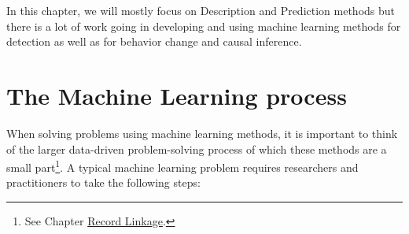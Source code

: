 \documentclass[]{krantz}
\begin{document}
In this chapter, we will mostly focus on Description and Prediction
methods but there is a lot of work going in developing and using machine
learning methods for detection as well as for behavior change and causal
inference.

\section{The Machine Learning
process}\label{the-machine-learning-process}

When solving problems using machine learning methods, it is important to
think of the larger data-driven problem-solving process of which these
methods are a small part\footnote{See Chapter
  \protect\hyperlink{chap:link}{Record Linkage}.}. A typical machine
learning problem requires researchers and practitioners to take the
following steps:
\end{document}
